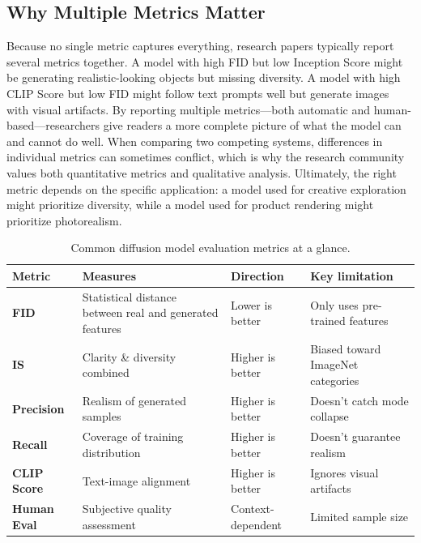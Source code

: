 \documentclass[a4paper,12pt]{article}
\begin{document}
\subsection{Why Multiple Metrics Matter}
Because no single metric captures everything, research papers typically report several metrics together. A model with high FID but low Inception Score might be generating realistic-looking objects but missing diversity. A model with high CLIP Score but low FID might follow text prompts well but generate images with visual artifacts. By reporting multiple metrics---both automatic and human-based---researchers give readers a more complete picture of what the model can and cannot do well. When comparing two competing systems, differences in individual metrics can sometimes conflict, which is why the research community values both quantitative metrics and qualitative analysis. Ultimately, the right metric depends on the specific application: a model used for creative exploration might prioritize diversity, while a model used for product rendering might prioritize photorealism.

\begin{table}[H]
    \centering
    {\small
    \begin{tabularx}{\linewidth}{>{\bfseries}p{2cm}>{\raggedright\arraybackslash}p{2.8cm}>{\raggedright\arraybackslash}p{2.8cm}>{\raggedright\arraybackslash}X}
        \toprule
        Metric & Measures & Direction & Key limitation \\
        \midrule
        FID & Statistical distance between real and generated features & Lower is better & Only uses pre-trained features \\
        IS & Clarity \& diversity combined & Higher is better & Biased toward ImageNet categories \\
        Precision & Realism of generated samples & Higher is better & Doesn't catch mode collapse \\
        Recall & Coverage of training distribution & Higher is better & Doesn't guarantee realism \\
        CLIP Score & Text-image alignment & Higher is better & Ignores visual artifacts \\
        Human Eval & Subjective quality assessment & Context-dependent & Limited sample size \\
        \bottomrule
    \end{tabularx}
    }
    \caption[Evaluation metrics summary]{Common diffusion model evaluation metrics at a glance.}
    \label{tab:metrics-comparison}
\end{table}
\end{document}
